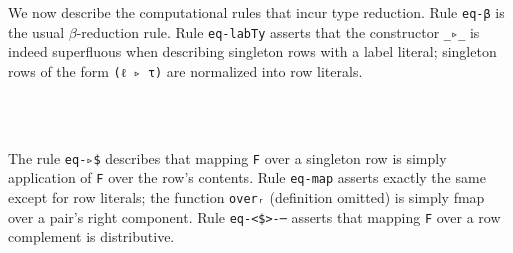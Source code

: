 \documentclass[authoryear, acmsmall, screen, review, nonacm]{acmart}
\begin{document}
We now describe the computational rules that incur type reduction. Rule \verb!eq-β! is the usual $\beta$-reduction rule. Rule \verb!eq-labTy! asserts that the constructor \verb!_▹_! is indeed superfluous when describing singleton rows with a label literal; singleton rows of the form \verb!(ℓ ▹ τ)! are normalized into row literals. 
\begin{code}%
%
\>[4]\AgdaSpace{}%
\AgdaSymbol{:}\AgdaSpace{}%
\AgdaSpace{}%
\AgdaSymbol{\{}\AgdaSpace{}%
\AgdaSymbol{:}\AgdaSpace{}%
\AgdaSpace{}%
\AgdaSymbol{(}\AgdaSpace{}%
\AgdaOperator{\AgdaInductiveConstructor{,,}}\AgdaSpace{}%
\AgdaSymbol{)}\AgdaSpace{}%
\AgdaSymbol{\}}\AgdaSpace{}%
\AgdaSymbol{\{}\AgdaSpace{}%
\AgdaSymbol{:}\AgdaSpace{}%
\AgdaSpace{}%
\AgdaSpace{}%
\AgdaSymbol{\}}\AgdaSpace{}%
\<%
\\
\>[4][@{}l@{\AgdaIndent{0}}]%
\>[6]\AgdaSymbol{((}\AgdaSpace{}%
\AgdaSymbol{)}\AgdaSpace{}%
\AgdaSpace{}%
\AgdaSymbol{)}\AgdaSpace{}%
\AgdaSpace{}%
\AgdaSymbol{(}\AgdaSpace{}%
\AgdaOperator{\AgdaFunction{βₖ[}}\AgdaSpace{}%
\AgdaSpace{}%
\AgdaOperator{\AgdaFunction{]}}\AgdaSymbol{)}\<%
\\
%
\>[4]\AgdaSpace{}%
\AgdaSymbol{:}\AgdaSpace{}%
\AgdaSpace{}%
\AgdaSpace{}%
\AgdaSpace{}%
\AgdaSpace{}%
\AgdaSpace{}%
\AgdaSymbol{(}\AgdaSpace{}%
\AgdaSpace{}%
\AgdaSymbol{)}\AgdaSpace{}%
\AgdaSpace{}%
\AgdaSpace{}%
\AgdaOperator{\AgdaFunction{[}}\AgdaSpace{}%
\AgdaSymbol{(}%
\>[47]\AgdaOperator{\AgdaInductiveConstructor{,}}\AgdaSpace{}%
\AgdaSymbol{)}\AgdaSpace{}%
\AgdaOperator{\AgdaFunction{]}}\AgdaSpace{}%
\AgdaSpace{}%
\<%
\end{code} 

\Ni The rule \verb!eq-▹$! describes that mapping \verb!F! over a singleton row is simply application of \verb!F! over the row's contents. Rule \verb!eq-map! asserts exactly the same except for row literals; the function \verb!overᵣ! (definition omitted) is simply fmap over a pair's right component. Rule \verb!eq-<$>-─! asserts that mapping \verb!F! over a row complement is distributive. 
\end{document}
